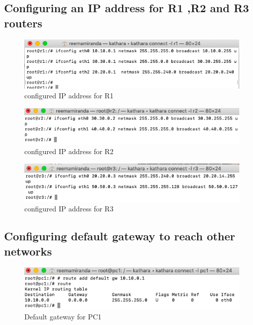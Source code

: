 \subsection{Configuring an IP address for R1 ,R2 and R3 routers }
 \begin{figure}[H]
\centering
  \includegraphics[width=400pt]{Images/r1.ip.png}
  \caption{configured IP address for R1}
  \label{fig:2.15}
\end{figure}
\begin{figure}[H]
\centering
  \includegraphics[width=400pt]{Images/r2_ip.png}
  \caption{configured IP address for R2}
  \label{fig:2.16}
\end{figure}
\begin{figure}[H]
\centering
  \includegraphics[width=500pt]{Images/r3.ip.png}
  \caption{configured IP address for R3}
  \label{fig:2.17}
\end{figure}
\subsection{Configuring default gateway to reach other networks }
 \begin{figure}[H]
\centering
  \includegraphics[width=400pt]{Images/pc1_gateway.png}
  \caption{Default gateway for PC1}
  \label{fig:2.18}
\end{figure}
